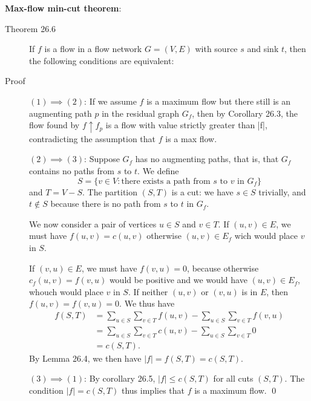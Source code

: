 \noindent \textbf{Max-flow min-cut theorem}:
\begin{description}
\item[Theorem 26.6] If $f$ is a flow in a flow network $G = (V,E)$ with source
  $s$ and sink $t$, then the following conditions are equivalent:

\item[Proof] $(1) \implies (2)$: If we assume $f$ is a maximum flow but there
  still is an augmenting path $p$ in the residual graph $G_f$, then by Corollary
  26.3, the flow found by $f\uparrow f_p$ is a flow with value strictly greater
  than |f|, contradicting the assumption that $f$ is a max flow.

  $(2) \implies (3)$: Suppose $G_f$ has no augmenting paths, that is, that $G_f$
  contains no paths from $s$ to $t$. We define
  \[
    S = \{v\in V : \text{there exists a path from $s$ to $v$ in $G_f$}\}
  \]
  and $T = V - S$. The partition $(S,T)$ is a cut: we have $s\in S$ trivially,
  and $t\notin S$ because there is no path from $s$ to $t$ in $G_f$.

  We now consider a pair of vertices $u\in S$ and $v \in T$. If $(u,v)\in E$, we
  must have $f(u,v) = c(u,v)$ otherwise $(u,v)\in E_f$ wich would place $v$ in
  $S$.

  If $(v,u) \in E$, we must have $f(v,u) = 0$, because otherwise $c_f(u,v) =
  f(v,u)$ would be positive and we would have $(u,v) \in E_f$, whouch would place
  $v$ in $S$. If neither $(u,v)$ or $(v,u)$ is in $E$, then $f(u,v) = f(v,u) =
  0$. We thus have
  \begin{align*}
    f(S,T) &= \sum_{u\in S}\sum_{v\in T}f(u,v) - \sum_{u\in S}\sum_{v\in T}f(v,u) \\
           &= \sum_{u\in S}\sum_{v\in T}c(u,v) - \sum_{u\in S}\sum_{v\in T} 0 \\
           &= c(S,T).
  \end{align*}
  By Lemma 26.4, we then have $|f| = f(S,T) = c(S,T)$.

  $(3) \implies (1)$: By corollary 26.5, $|f| \leq c(S,T)$ for all cuts
  $(S,T)$. The condition $|f| = c(S,T)$ thus implies that $f$ is a maximum flow.
  \qed
\end{description}



